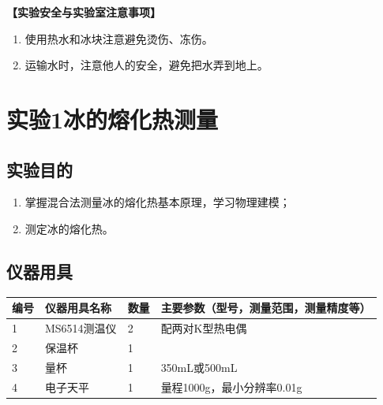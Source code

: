 \documentclass[dvipsnames, svgnames,a4paper,11pt]{article}
\begin{document}
{\color{red}\textbf{【实验安全与实验室注意事项】}
\begin{enumerate}
	\item 使用热水和冰块注意避免烫伤、冻伤。
	\item 运输水时，注意他人的安全，避免把水弄到地上。
\end{enumerate}}

\clearpage
\tableofcontents
\clearpage

\setcounter{section}{0}
\section{实验1\hspace{0.3cm}冰的熔化热测量}
	
\subsection{实验目的}
\begin{enumerate}
	\item 掌握混合法测量冰的熔化热基本原理，学习物理建模；
	\item 测定冰的熔化热。
\end{enumerate}

\subsection{仪器用具}
\begin{table}[htbp]
	\centering
	\renewcommand\arraystretch{1.6}
	\begin{tabular}{p{}|p{}|p{}|p{}}
	\hline
	编号& 仪器用具名称 & 数量 &  主要参数（型号，测量范围，测量精度等） \\
	\hline
	1&MS6514测温仪 &2 & 配两对K型热电偶\\

	2&保温杯 &1& \\
	
	3&量杯 & 1 &350mL或500mL \\
	
	4&电子天平&1 & 量程1000g，最小分辨率0.01g\\
	\hline
\end{tabular}
\end{table}
\end{document}
